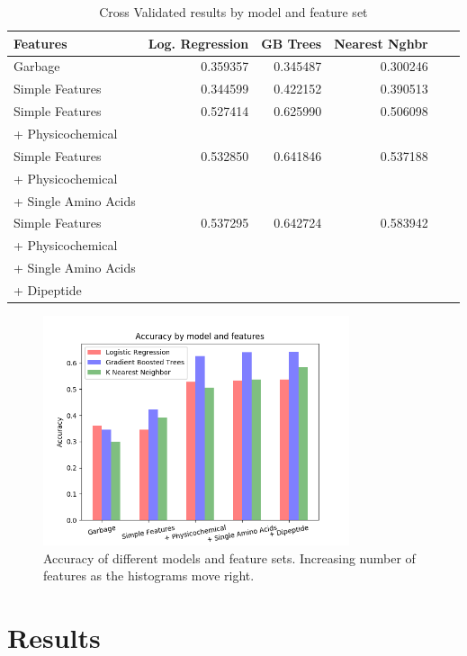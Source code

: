 \documentclass{bioinfo}
\begin{document}
\begin{table}
\caption{Cross Validated results by model and feature set}
\label{results}
\begin{center}
\begin{tabular}{|l|r|r|r|r|r|}
\hline
 Features & Log. Regression & GB Trees & Nearest Nghbr \\
\hline
 Garbage &
        0.359357 &
        0.345487 &
        0.300246 \\
\hline
 Simple Features &
          0.344599 &
          0.422152 &
          0.390513 \\
\hline
 Simple Features &
          0.527414 &
          0.625990 &
          0.506098 \\
 + Physicochemical & & & \\
\hline
 Simple Features &
          0.532850 &
          0.641846 &
          0.537188 \\
 + Physicochemical & & & \\
 + Single Amino Acids & & & \\
\hline
 Simple Features &
          0.537295 &
          0.642724 &
          0.583942 \\
 + Physicochemical & & & \\
 + Single Amino Acids & & & \\
 + Dipeptide & & & \\
\hline
\end{tabular}
\end{center}
\end{table}

\begin{figure}[H]
  \includegraphics[width=9cm]{histogram}
  \caption{Accuracy of different models and feature sets. Increasing number of features as the histograms move right.}
\end{figure}

\section{Results}
\end{document}
